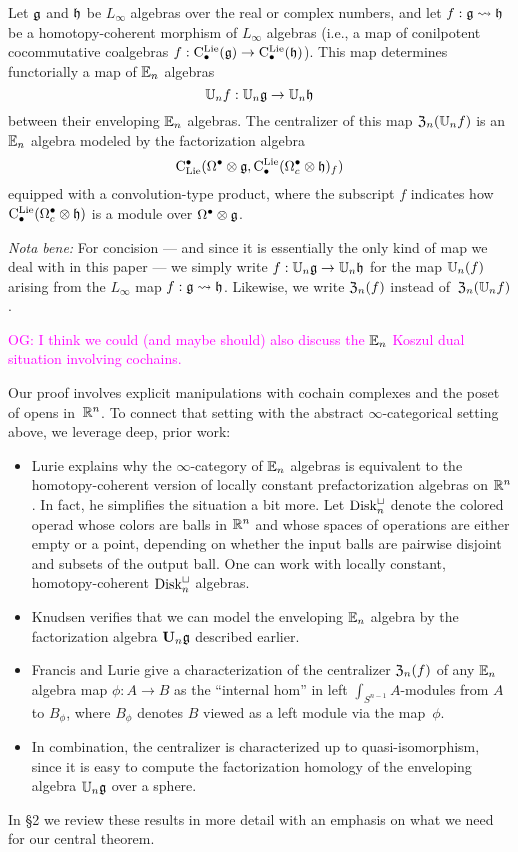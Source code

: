 \documentclass[11pt]{amsart}
\numberwithin{equation}{section}
\def\owen{\textcolor{magenta}{OG: }\textcolor{magenta}}
\begin{document}
\begin{thm}
\label{thm: centralizer}
Let $\mathfrak g$ and $\mathfrak h$ be $L_\infty$ algebras over the real or complex numbers, 
and let $f: \mathfrak g \rightsquigarrow \mathfrak h$ be a homotopy-coherent morphism of $L_\infty$ algebras
(i.e., a map of conilpotent cocommutative coalgebras $f: {\rm C}^{\rm Lie}_\bullet(\mathfrak g) \to {\rm C}^{\rm Lie}_\bullet(\mathfrak h)$).
This map determines functorially a map of $\mathbb E_n$ algebras
\[
\mathbb U_n f: \mathbb U_n \mathfrak g \to \mathbb U_n \mathfrak h
\]
between their enveloping $\mathbb E_n$ algebras.
The centralizer of this map ${\frak Z}_n(\mathbb U_n f)$ is an $\mathbb E_n$ algebra modeled by the factorization algebra 
\[
{\rm C}_{\rm Lie}^\bullet(\Omega^\bullet \otimes \mathfrak g, {\rm C}^{\rm Lie}_\bullet(\Omega^\bullet_c \otimes \mathfrak h)_f)
\]
equipped with a convolution-type product,
where the subscript $f$ indicates how ${\rm C}^{\rm Lie}_\bullet(\Omega^\bullet_c \otimes \mathfrak h)$ is a module over $\Omega^\bullet \otimes \mathfrak g$.
\end{thm}

{\em Nota bene:}\/ For concision --- and since it is essentially the only kind of map we deal with in this paper --- we simply write $f: \mathbb U_n \mathfrak g \to \mathbb U_n \mathfrak h$ for the map $\mathbb U_n(f)$ arising from the $L_\infty$ map $f: \mathfrak g \rightsquigarrow \mathfrak h$.
Likewise, we write ${\frak Z}_n(f)$ instead of~${\frak Z}_n(\mathbb U_n f)$.

\owen{I think we could (and maybe should) also discuss the $\mathbb E_n$ Koszul dual situation involving cochains.}

\def\Disk{{\rm Disk}}

Our proof involves explicit manipulations with cochain complexes and the poset of opens in~$\mathbb R^n$.
To connect that setting with the abstract $\infty$-categorical setting above,
we leverage deep, prior work:
\begin{itemize}
\item Lurie \cite{LurieHA} explains why the $\infty$-category of $\mathbb E_n$ algebras is equivalent to the homotopy-coherent version of locally constant prefactorization algebras on $\mathbb R^n$.  
In fact, he simplifies the situation a bit more. 
Let $\Disk_n^\sqcup$ denote the colored operad whose colors are balls in $\mathbb R^n$ and whose spaces of operations are either empty or a point, depending on whether the input balls are pairwise disjoint and subsets of the output ball. 
One can work with locally constant, homotopy-coherent $\Disk_n^\sqcup$ algebras.
\item Knudsen verifies that we can model the enveloping $\mathbb E_n$ algebra by the factorization algebra $\mathbf U_n \mathfrak g$ described earlier.
\item Francis and Lurie give a characterization of the centralizer ${\frak Z}_n(f)$ of any $\mathbb E_n$ algebra map $\phi: A \to B$ as the ``internal hom'' in left $\int_{S^{n-1}}A$-modules from $A$ to $B_\phi$, where $B_\phi$ denotes $B$ viewed as a left module via the map~$\phi$.
\item In combination, the centralizer is characterized up to quasi-isomorphism, 
since it is easy to compute the factorization homology of the enveloping algebra $\mathbb U_n \mathfrak g$ over a sphere.
\end{itemize}
In \S2 we review these results in more detail with an emphasis on what we need for our central theorem.
\end{document}
